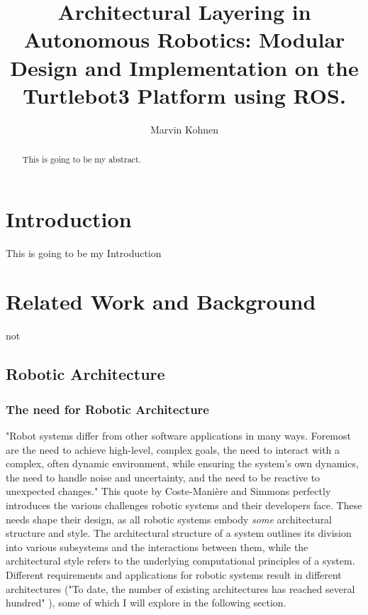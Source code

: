 \documentclass[]{article}
\title{Architectural Layering in Autonomous Robotics: Modular Design and Implementation on the Turtlebot3 Platform using ROS. }
\author{Marvin Kohnen}
\begin{document}
	\onehalfspacing
	\maketitle
	
	\newpage
	
	\tableofcontents
	\newpage
	
	\begin{abstract}
		This is going to be my abstract.
	\end{abstract}
	
	
	
	\section{Introduction}
	This is going to be my Introduction
	\section{Related Work and Background}not
	\subsection{Robotic Architecture}
	\subsubsection{The need for Robotic Architecture}
	"Robot systems differ from other software applications in many ways. Foremost are the need to achieve high-level, complex goals, the need to interact with a complex, often dynamic environment, while ensuring the system’s own dynamics, the need to handle noise and uncertainty, and the need to be reactive to unexpected changes." \autocite{coste-maniereArchitectureBackboneRobotic2000} This quote by Coste-Mani\`{e}re and Simmons perfectly introduces the various challenges robotic systems and their developers face. These needs shape their design, as all robotic systems embody \textit{some} architectural structure and style. The architectural structure of a system outlines its division into various subsystems and the interactions between them, while the architectural style refers to the underlying computational principles of a system. \autocite{coste-maniereArchitectureBackboneRobotic2000} Different requirements and applications for robotic systems result in different architectures ("To date, the number of existing architectures has reached several hundred" \autocite{kotseruba40YearsCognitive2020}), some of which I will explore in the following section.
	
\end{document}
